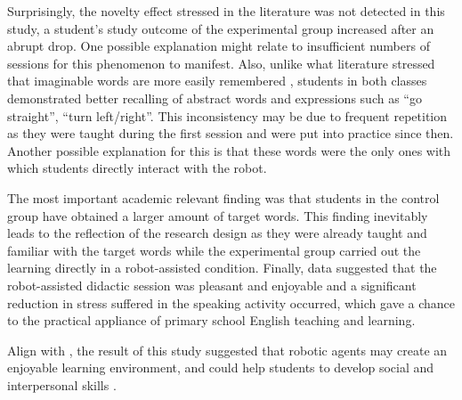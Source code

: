 \documentclass[english]{textolivre}
\begin{document}
Surprisingly, the novelty effect stressed in the literature \cite{diaz_building_2011,han_physical_2009,van_den_berghe_social_2019,yamamoto_trial_2006} was not detected in this study, a student’s study outcome of the experimental group increased after an abrupt drop. One possible explanation might relate to insufficient numbers of sessions for this phenomenon to manifest. Also, unlike what literature stressed that imaginable words are more easily remembered \cite{ellis_essentials_2019,lupyan_words_2015}, students in both classes demonstrated better recalling of abstract words and expressions such as “go straight”, “turn left/right”. This inconsistency may be due to frequent repetition as they were taught during the first session and were put into practice since then. Another possible explanation for this is that these words were the only ones with which students directly interact with the robot. 

The most important academic relevant finding was that students in the control group have obtained a larger amount of target words. This finding inevitably leads to the reflection of the research design as they were already taught and familiar with the target words while the experimental group carried out the learning directly in a robot-assisted condition. Finally, data suggested that the robot-assisted didactic session was pleasant and enjoyable and a significant reduction in stress suffered in the speaking activity occurred, which gave a chance to the practical appliance of primary school English teaching and learning.

Align with \textcite{han_physical_2009}, the result of this study suggested that robotic agents may create an enjoyable learning environment, and could help students to develop social and interpersonal skills \cite{diaz_building_2011,mubin_review_2013}.
\end{document}

